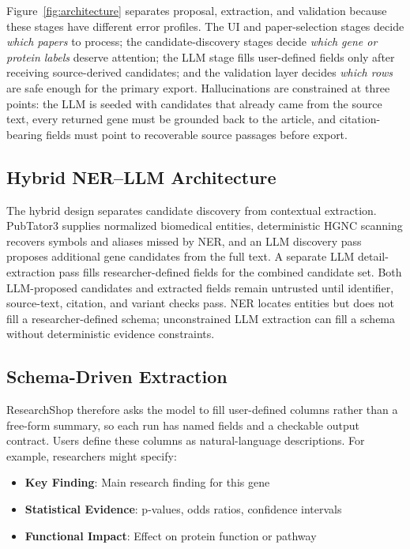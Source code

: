 Figure~\ref{fig:architecture} separates proposal, extraction, and validation because these stages have different error profiles. The UI and paper-selection stages decide \emph{which papers} to process; the candidate-discovery stages decide \emph{which gene or protein labels} deserve attention; the LLM stage fills user-defined fields only after receiving source-derived candidates; and the validation layer decides \emph{which rows} are safe enough for the primary export. Hallucinations are constrained at three points: the LLM is seeded with candidates that already came from the source text, every returned gene must be grounded back to the article, and citation-bearing fields must point to recoverable source passages before export.

\subsection{Hybrid NER--LLM Architecture}

The hybrid design separates candidate discovery from contextual extraction. PubTator3 supplies normalized biomedical entities, deterministic HGNC scanning recovers symbols and aliases missed by NER, and an LLM discovery pass proposes additional gene candidates from the full text. A separate LLM detail-extraction pass fills researcher-defined fields for the combined candidate set. Both LLM-proposed candidates and extracted fields remain untrusted until identifier, source-text, citation, and variant checks pass. NER locates entities but does not fill a researcher-defined schema; unconstrained LLM extraction can fill a schema without deterministic evidence constraints.

\subsection{Schema-Driven Extraction}

ResearchShop therefore asks the model to fill user-defined columns rather than a free-form summary, so each run has named fields and a checkable output contract. Users define these columns as natural-language descriptions. For example, researchers might specify:

\begin{itemize}[itemsep=1pt]
    \item \textbf{Key Finding}: Main research finding for this gene
    \item \textbf{Statistical Evidence}: p-values, odds ratios, confidence intervals
    \item \textbf{Functional Impact}: Effect on protein function or pathway
\end{itemize}

